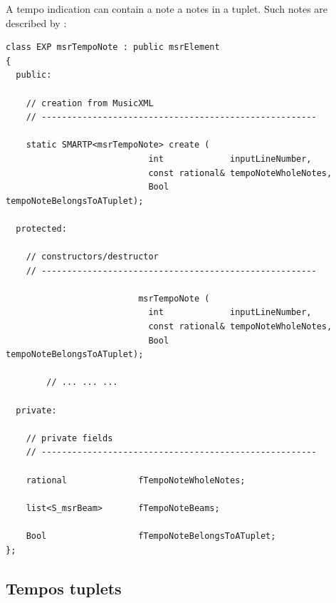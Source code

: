 A tempo indication can contain a note a notes in a tuplet. Such notes are described by :
\begin{lstlisting}[language=CPlusPlus]
class EXP msrTempoNote : public msrElement
{
  public:

    // creation from MusicXML
    // ------------------------------------------------------

    static SMARTP<msrTempoNote> create (
                            int             inputLineNumber,
                            const rational& tempoNoteWholeNotes,
                            Bool            tempoNoteBelongsToATuplet);

  protected:

    // constructors/destructor
    // ------------------------------------------------------

                          msrTempoNote (
                            int             inputLineNumber,
                            const rational& tempoNoteWholeNotes,
                            Bool            tempoNoteBelongsToATuplet);

		// ... ... ...

  private:

    // private fields
    // ------------------------------------------------------

    rational              fTempoNoteWholeNotes;

    list<S_msrBeam>       fTempoNoteBeams;

    Bool                  fTempoNoteBelongsToATuplet;
};
\end{lstlisting}

\subsection{Tempos tuplets}\label{Tempos tuplets}

